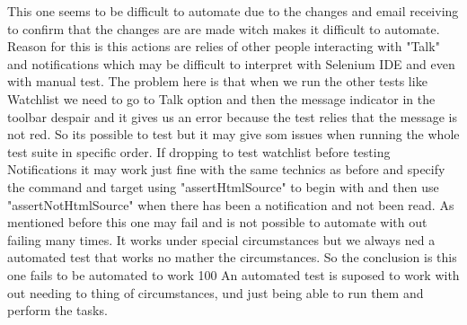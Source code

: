 \documentclass[a4paper,10pt]{article}
\begin{document}
This one seems to be difficult to automate due to the changes and email receiving to confirm that the changes are 
are made witch makes it difficult to automate. Reason for this is this actions are relies of other people interacting with "Talk"
and notifications which may be difficult to interpret with Selenium IDE and even with manual test. The problem here is that when we run
the other tests like Watchlist we need to go to Talk option and then the message indicator in the toolbar despair and it gives us an error
because the test relies that the message is not red. So its possible to test but it may give som issues when running the whole test suite in
specific order. If dropping to test watchlist before testing Notifications it may work just fine with the same technics as before
and specify the command and target using "assertHtmlSource" to begin with and then use  "assertNotHtmlSource" when there has been a
notification and not been read. As mentioned before this one may fail and is not possible to automate with out failing many times.
It works under special circumstances but we always ned a automated test that works no mather the circumstances. So the conclusion is
this one fails to be automated to work 100%
An automated test is suposed to work with out needing to thing of circumstances, und just being able to run them and perform the tasks.
\end{document}
